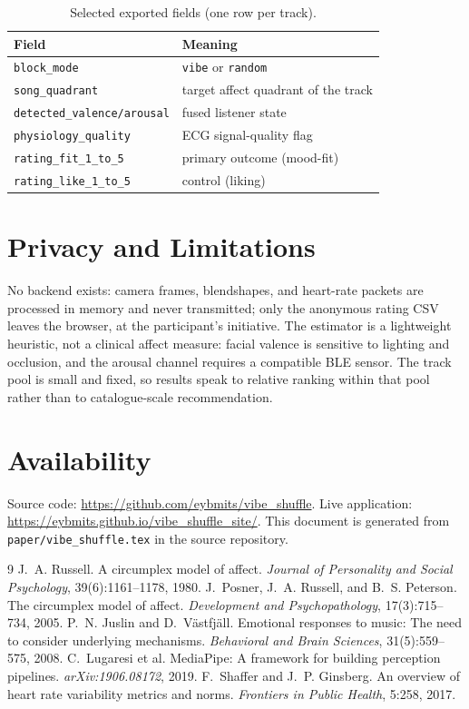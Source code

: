 \documentclass[11pt]{article}
\begin{document}
\begin{table}[t]
\centering
\small
\caption{Selected exported fields (one row per track).}
\label{tab:schema}
\begin{tabular}{@{}ll@{}}
\toprule
Field & Meaning \\
\midrule
\texttt{block\_mode} & \texttt{vibe} or \texttt{random} \\
\texttt{song\_quadrant} & target affect quadrant of the track \\
\texttt{detected\_valence/arousal} & fused listener state \\
\texttt{physiology\_quality} & ECG signal-quality flag \\
\texttt{rating\_fit\_1\_to\_5} & primary outcome (mood-fit) \\
\texttt{rating\_like\_1\_to\_5} & control (liking) \\
\bottomrule
\end{tabular}
\end{table}

\section{Privacy and Limitations}
No backend exists: camera frames, blendshapes, and heart-rate packets are
processed in memory and never transmitted; only the anonymous rating CSV leaves
the browser, at the participant's initiative. The estimator is a lightweight
heuristic, not a clinical affect measure: facial valence is sensitive to
lighting and occlusion, and the arousal channel requires a compatible BLE
sensor. The track pool is small and fixed, so results speak to relative ranking
within that pool rather than to catalogue-scale recommendation.

\section{Availability}
Source code: \url{https://github.com/eybmits/vibe_shuffle}. Live application:
\url{https://eybmits.github.io/vibe_shuffle_site/}. This document is generated
from \texttt{paper/vibe\_shuffle.tex} in the source repository.

\begin{thebibliography}{9}
 J.~A. Russell. A circumplex model of affect.
\emph{Journal of Personality and Social Psychology}, 39(6):1161--1178, 1980.
 J.~Posner, J.~A. Russell, and B.~S. Peterson. The
circumplex model of affect. \emph{Development and Psychopathology},
17(3):715--734, 2005.
 P.~N. Juslin and D.~V\"astfj\"all. Emotional responses to
music: The need to consider underlying mechanisms. \emph{Behavioral and Brain
Sciences}, 31(5):559--575, 2008.
 C.~Lugaresi et al. MediaPipe: A framework for building
perception pipelines. \emph{arXiv:1906.08172}, 2019.
 F.~Shaffer and J.~P. Ginsberg. An overview of heart rate
variability metrics and norms. \emph{Frontiers in Public Health}, 5:258, 2017.
\end{thebibliography}
\end{document}
